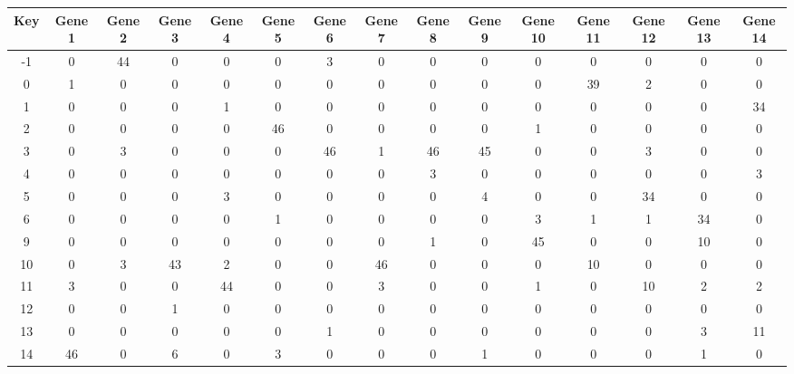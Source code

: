 \begin{tabular}{|c|c|c|c|c|c|c|c|c|c|c|c|c|c|c|}
\hline
Key & Gene 1 & Gene 2 & Gene 3 & Gene 4 & Gene 5 & Gene 6 & Gene 7 & Gene 8 & Gene 9 & Gene 10 & Gene 11 & Gene 12 & Gene 13 & Gene 14 \\
\hline
-1 & 0 & 44 & 0 & 0 & 0 & 3 & 0 & 0 & 0 & 0 & 0 & 0 & 0 & 0 \\
0 & 1 & 0 & 0 & 0 & 0 & 0 & 0 & 0 & 0 & 0 & 39 & 2 & 0 & 0 \\
1 & 0 & 0 & 0 & 1 & 0 & 0 & 0 & 0 & 0 & 0 & 0 & 0 & 0 & 34 \\
2 & 0 & 0 & 0 & 0 & 46 & 0 & 0 & 0 & 0 & 1 & 0 & 0 & 0 & 0 \\
3 & 0 & 3 & 0 & 0 & 0 & 46 & 1 & 46 & 45 & 0 & 0 & 3 & 0 & 0 \\
4 & 0 & 0 & 0 & 0 & 0 & 0 & 0 & 3 & 0 & 0 & 0 & 0 & 0 & 3 \\
5 & 0 & 0 & 0 & 3 & 0 & 0 & 0 & 0 & 4 & 0 & 0 & 34 & 0 & 0 \\
6 & 0 & 0 & 0 & 0 & 1 & 0 & 0 & 0 & 0 & 3 & 1 & 1 & 34 & 0 \\
9 & 0 & 0 & 0 & 0 & 0 & 0 & 0 & 1 & 0 & 45 & 0 & 0 & 10 & 0 \\
10 & 0 & 3 & 43 & 2 & 0 & 0 & 46 & 0 & 0 & 0 & 10 & 0 & 0 & 0 \\
11 & 3 & 0 & 0 & 44 & 0 & 0 & 3 & 0 & 0 & 1 & 0 & 10 & 2 & 2 \\
12 & 0 & 0 & 1 & 0 & 0 & 0 & 0 & 0 & 0 & 0 & 0 & 0 & 0 & 0 \\
13 & 0 & 0 & 0 & 0 & 0 & 1 & 0 & 0 & 0 & 0 & 0 & 0 & 3 & 11 \\
14 & 46 & 0 & 6 & 0 & 3 & 0 & 0 & 0 & 1 & 0 & 0 & 0 & 1 & 0 \\
\hline
\end{tabular}
